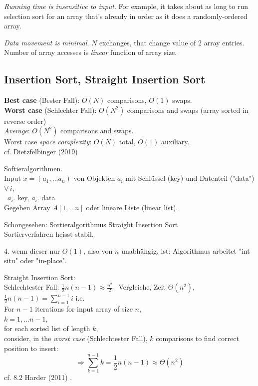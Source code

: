 \documentclass[10pt]{amsart}
\begin{document}
\begin{multicols*}{2}
\emph{Running time is insensitive to input}. For example, it takes about as long to run selection sort for an array that's already in order as it does a randomly-ordered array.

\emph{Data movement is minimal}. $N$ exchanges, that change value of 2 array entries. Number of array accesses is \emph{linear} function of array size. 



\subsection{Insertion Sort, Straight Insertion Sort}

\textbf{Best case} (Bester Fall): $O(N)$ comparisons, $O(1)$ swaps. \\
\textbf{Worst case} (Schlechter Fall): $O(N^2)$ comparisons and swaps (array sorted in reverse order) \\
\emph{Average}: $O(N^2)$ comparisons and swaps. \\

Worst case \emph{space complexity}: $O(N)$ total, $O(1)$ auxiliary. \\


cf. Dietzfelbinger (2019) \cite{Diet2019}

Softieralgorithmen. \\

Input $x = (a_1, \dots a_n)$ von Objekten $a_i$ mit Schl\"{u}ssel-(key) und Datenteil ("data") $\forall \, i$, \\
\quad \quad \, $a_i .$ key, $a_i . $ data \\

Gegeben Array $A[1,\dots n]$ oder lineare Liste (linear list).

Schongesehen: Sortieralgorithmus Straight Insertion Sort \\
Sortierverfahren heisst stabil.

4. wenn dieser nur $O(1)$, also von $n$ unabh\"{a}ngig, ist: Algorithmus arbeitet "int situ" oder "in-place".

Straight Insertion Sort: \\

Schlechtester Fall: $\frac{1}{2}n(n-1) \approx \frac{n^2}{2}$ \quad \, Vergleiche, Zeit $\Theta(n^2)$, \\
$\frac{1}{2} n (n-1) = \sum_{i=1}^{n-1} i $ i.e. \\

For $n-1$ iterations for input array of size $n$, \\
$k = 1, \dots n-1$, \\
for each sorted list of length $k$, \\
consider, in the \emph{worst case} (Schlechtester Fall), $k$ comparisons to find correct position to insert: 
\[
\Longrightarrow \sum_{k=1}^{n-1} k = \frac{1}{2} n ( n -1) \approx \Theta(n^2)
\]cf. 8.2 Harder (2011) \cite{Hard2018}. \\



\end{multicols*}
\end{document}
